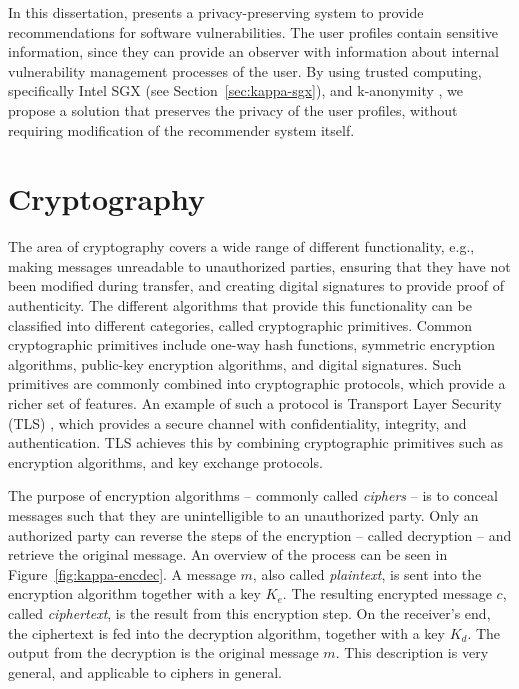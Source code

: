 In this dissertation,  presents a privacy-preserving system to provide recommendations for software vulnerabilities.
The user profiles contain sensitive information, since they can provide an observer with information about internal vulnerability management processes of the user.
By using trusted computing, specifically Intel SGX (see Section~\ref{sec:kappa-sgx}), and k-anonymity \cite{samarati:1998,samarati:2001}, we propose a solution that preserves the privacy of the user profiles, without requiring modification of the recommender system itself.

\newpage
\section{Cryptography}
\label{sec:kappa-cryptography}

The area of cryptography covers a wide range of different functionality, e.g., making messages unreadable to unauthorized parties, ensuring that they have not been modified during transfer, and creating digital signatures to provide proof of authenticity.
The different algorithms that provide this functionality can be classified into different categories, called cryptographic primitives.
Common cryptographic primitives include one-way hash functions, symmetric encryption algorithms, public-key encryption algorithms, and digital signatures.
Such primitives are commonly combined into cryptographic protocols, which provide a richer set of features.
An example of such a protocol is Transport Layer Security (TLS) \cite{rfc8446}, which provides a secure channel with confidentiality, integrity, and authentication.
TLS achieves this by combining cryptographic primitives such as encryption algorithms, and key exchange protocols.

The purpose of encryption algorithms -- commonly called \emph{ciphers} -- is to conceal messages such that they are unintelligible to an unauthorized party.
Only an authorized party can reverse the steps of the encryption -- called decryption -- and retrieve the original message.
An overview of the process can be seen in Figure~\ref{fig:kappa-encdec}.
A message $m$, also called \emph{plaintext}, is sent into the encryption algorithm together with a key $K_e$.
The resulting encrypted message $c$, called \emph{ciphertext}, is the result from this encryption step.
On the receiver's end, the ciphertext is fed into the decryption algorithm, together with a key $K_d$.
The output from the decryption is the original message $m$.
This description is very general, and applicable to ciphers in general.


